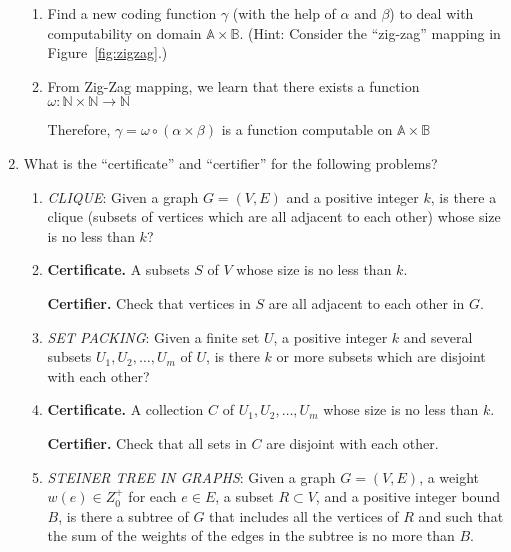 \documentclass[12pt,a4paper]{article}
\makeatletter
\newtheorem*{solution}{Solution}
\theoremstyle{definition}
\renewenvironment{solution}[1][Solution] {\par\pushQED{\qed}\normalfont\topsep6\p@\@plus6\p@\relax\trivlist\item[\hskip\labelsep\bfseries#1\@addpunct{.}]\ignorespaces}{\popQED\endtrivlist\@endpefalse} \makeatother
\makeatother
\begin{document}
\begin{enumerate}
\begin{enumerate}
	\item Find a new coding function $\gamma$ (with the help of $\alpha$ and $\beta$) to deal with computability on domain $\mathbb{A} \times \mathbb{B}$. {\color{blue}(Hint: Consider the ``zig-zag'' mapping in Figure~\ref{fig:zigzag}.)}
	
	\begin{solution}
		From Zig-Zag mapping, we learn that there exists a function $\omega:\mathbb{N}\times\mathbb{N}\rightarrow\mathbb{N}$
		
		Therefore, $\gamma=\omega\circ(\alpha\times\beta)$ is a function computable on $\mathbb{A}\times\mathbb{B}$
	\end{solution}
\end{enumerate}

\item  What is the ``certificate'' and ``certifier'' for the following problems?
\begin{enumerate}
	
	\item \emph{CLIQUE}: Given a graph $G=(V,E)$ and a positive integer $k$, is there a clique (subsets of vertices which are all adjacent to each other) whose size is no less than $k$?
	
	\begin{solution}\quad
		
		\textbf{Certificate.} A subsets $S$ of $V$ whose size is no less than $k$.
		
		\textbf{Certifier.} Check that vertices in $S$ are all adjacent to each other in $G$.
		
	\end{solution}

	\item \emph{SET PACKING}: Given a finite set $U$, a positive integer $k$ and several subsets $U_1, U_2, \ldots, U_m$ of $U$, is there $k$ or more subsets which are disjoint with each other?
	
	\begin{solution}\quad
		
		\textbf{Certificate.} A collection $C$ of $U_1, U_2, \ldots, U_m$ whose size is no less than $k$.
		
		\textbf{Certifier.} Check that all sets in $C$ are disjoint with each other.
		
	\end{solution}
	
	\item \emph{STEINER TREE IN GRAPHS}: Given a graph $G=(V,E)$, a weight $w(e)\in Z_0^{+}$ for each $e\in E$, a subset $R \subset V$, and a positive integer bound $B$, is there a subtree of $G$ that includes all the vertices of $R$ and such that the sum of the weights of the edges in the subtree is no more than $B$.
	

\end{enumerate}
\end{enumerate}
\end{document}
